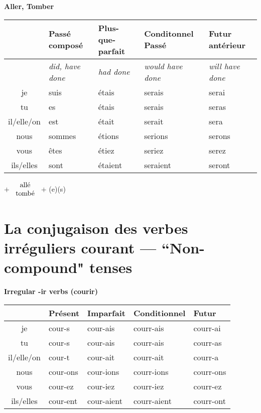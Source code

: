 \begin{flushleft}
\textbf{Aller, Tomber}
\vskip 0.1cm
\begin{tabular}{|c||L{2.5cm}|L{2.5cm}|L{2.5cm}|L{2.5cm}|}
\hline
& Pass\'e compos\'e & Plus-que-parfait & Conditonnel Pass\'e & Futur ant\'erieur \\
\hline
& \textit{did, have done} & \textit{had done} & \textit{would have done} & \textit{will have done} \\
\hline\hline
je            &	suis	&	\'etais	&	serais	 &	serai	\\
tu            &	es 	&	\'etais	&	serais	&	seras	\\
il/elle/on  &	est	&	\'etait	&	serait	&	sera	\\
nous       &	sommes	&	\'etions	&	serions	&	serons	\\
vous       &	\^etes	&	\'etiez	&	seriez		&	serez	\\
ils/elles   &	sont 	&	\'etaient	&	seraient	&	seront	\\
\hline
\end{tabular}
\;$+$
$\begin{array}{c}
\textnormal{all\'e}
\\
\textnormal{tomb\'e}
\end{array}$
$+$ (e)(s)
\end{flushleft}


\clearpage
\section{La conjugaison des verbes irr\'eguliers courant --- ``Non-compound" tenses}
\setcounter{theorem}{0}
\setcounter{equation}{0}

\renewcommand{\stemPresent}{cour}
\renewcommand{\stemFutur}{courr}
\begin{center}
\textbf{Irregular -ir verbs (courir)}
\vskip 0.1cm
\begin{tabular}{|c||L{3cm}|L{3cm}|L{3cm}|L{3cm}|}
\hline
& Pr\'esent & Imparfait & Conditionnel & Futur \\
\hline\hline
je           &	\stemPresent-s 	&	\stemPresent-ais	&	\stemFutur-ais	 &	\stemFutur-ai	\\
tu           &	\stemPresent-s	&	\stemPresent-ais	&	\stemFutur-ais	&	\stemFutur-as	\\
il/elle/on &	\stemPresent-t	&	\stemPresent-ait	&	\stemFutur-ait	&	\stemFutur-a	\\
nous      &	\stemPresent-ons	&	\stemPresent-ions	&	\stemFutur-ions	&	\stemFutur-ons	\\
vous      &	\stemPresent-ez	&	\stemPresent-iez	&	\stemFutur-iez		&	\stemFutur-ez	\\
ils/elles  &	\stemPresent-ent	&	\stemPresent-aient	&	\stemFutur-aient	&	\stemFutur-ont	\\
\hline
\end{tabular}
\end{center}







